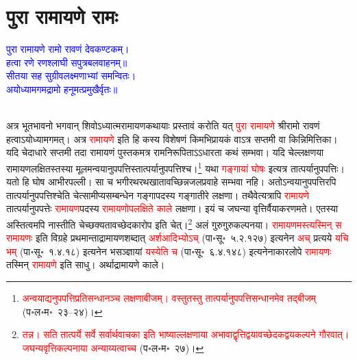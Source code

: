 \section[पुरा रामायणे रामः]{पुरा रामायणे रामः}
\centering\textcolor{blue}{पुरा रामायणे रामो रावणं देवकण्टकम्।\nopagebreak\\
हत्वा रणे रणश्लाघी सपुत्रबलवाहनम्॥\\
सीतया सह सुग्रीवलक्ष्मणाभ्यां समन्वितः।\nopagebreak\\
अयोध्यामगमद्रामो हनूमत्प्रमुखैर्वृतः॥}\nopagebreak\\
\\
\begin{sloppypar}\justifying\noindent\hspace{10mm} अत्र भूतभावनो भगवान् शिवोऽध्यात्म\-रामायण\-कथायाः प्रस्तावं करोति यत् \textcolor{red}{पुरा रामायणे} श्रीरामो रावणं हत्वाऽयोध्यामगमत्। अत्र \textcolor{red}{रामायणे} इति हि कस्य विशेषणं किमभिप्रायकं वाऽत्र सप्तमी वा किन्निमित्तिका। यदि चेदाधारे सप्तमी तदा रामायणं पुस्तकमत्र राम\-निरूपिताऽऽधारता कथं सम्भवा। यदि चेल्लक्षणया रामायण\-लक्षितस्तस्या मूलमन्वयानुप\-पत्तिस्तात्पर्यानुप\-पत्तिश्च।\footnote{\textcolor{red}{अन्वयाद्यनुपपत्ति\-प्रतिसन्धानञ्च लक्षणाबीजम्। वस्तुतस्तु तात्पर्यानुपपत्ति\-सन्धानमेव तद्बीजम्} (प॰ल॰म॰~२३–२४)।} यथा \textcolor{red}{गङ्गायां घोषः} इत्यत्र तात्पर्यानुपपत्तिः। यतो हि घोष आभीरपल्ली। सा च भगीरथ\-रथ\-खातावच्छिन्न\-जल\-प्रवाहे सम्भवा नहि। अतोऽन्वयानुप\-पत्तिरपि तात्पर्यानुपपत्तिश्चेति चेत्सामीप्य\-सम्बन्धेन गङ्गा\-पदस्य गङ्गा\-तीरे लक्षणा। तथैवेत्यत्रापि \textcolor{red}{रामायणे} तात्पर्यानुपपत्तेः \textcolor{red}{रामायण}\-पदस्य \textcolor{red}{रामायणोपलक्षिते काले} लक्षणा। इयं च जघन्या वृत्तिर्वैयाकरण\-मते। एतस्या अस्तित्वमपि नास्तीति चेच्छक्यतावच्छेदकारोप इति चेत्।\footnote{\textcolor{red}{तन्न। सति तात्पर्ये सर्वे सर्वार्थवाचका इति भाष्याल्लक्षणाया अभावाद्वृत्ति\-द्वयावच्छेदक\-द्वय\-कल्पने गौरवात्। जघन्य\-वृत्ति\-कल्पनाया अन्याय्यत्वाच्च} (प॰ल॰म॰~२७)।} 
अलं गुरु\-गुरु\-कल्पनया। \textcolor{red}{रामायणमस्त्यस्मिन् स रामायणः} इति विग्रहे प्रथमान्ताद्रामायण\-शब्दात् \textcolor{red}{अर्श\-आदिभ्योऽच्} (पा॰सू॰~५.२.१२७) इत्यनेन \textcolor{red}{अच्} प्रत्यये \textcolor{red}{यचि भम्} (पा॰सू॰~१.४.१८) इत्यनेन भ\-सञ्ज्ञायां \textcolor{red}{यस्येति च} (पा॰सू॰~६.४.१४८) इत्यनेनाकार\-लोपे \textcolor{red}{रामायणः} तस्मिन् \textcolor{red}{रामायणे} इति साधु। अर्थाद्रामायणे काले।\end{sloppypar}

